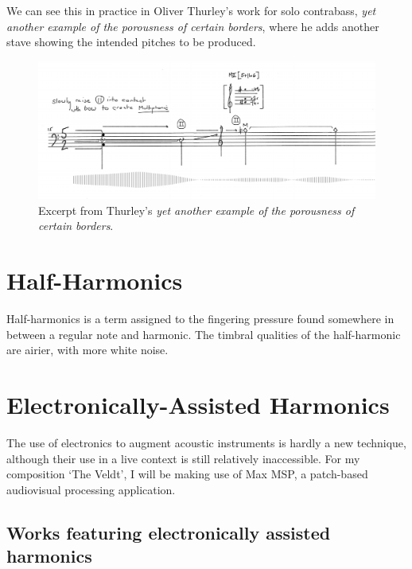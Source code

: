  We can see this in practice in Oliver Thurley's work for solo contrabass, \emph{yet another example of the porousness of certain borders}, where he adds another stave showing the intended pitches to be produced.\autocite{thurleyAnotherExamplePorousness2014}

  \begin{figure}
    \includegraphics[width=\linewidth]{./resources/thurleyMultiphonicNotation.png}
    \caption{Excerpt from Thurley's \emph{yet another example of the porousness of certain borders}.}
\label{fig:Excerpt from Thurley's `yet another example of the porousness of certain borders'}
  \end{figure}

\section{Half-Harmonics}
Half-harmonics is a term assigned to the fingering pressure found somewhere in between a regular note and harmonic. The timbral qualities of the half-harmonic are airier, with more white noise.

\section{Electronically-Assisted Harmonics}
The use of electronics to augment acoustic instruments is hardly a new technique, although their use in a live context is still relatively inaccessible. For my composition `The Veldt', I will be making use of Max MSP, a patch-based audiovisual processing application. 

\subsection{Works featuring electronically assisted harmonics}
